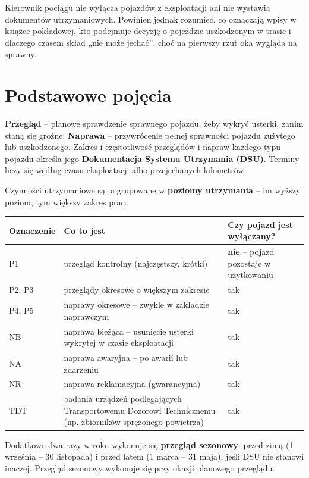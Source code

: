 Kierownik pociągu nie wyłącza pojazdów z eksploatacji ani nie wystawia dokumentów utrzymaniowych. Powinien jednak rozumieć, co oznaczają wpisy w książce pokładowej, kto podejmuje decyzję o pojeździe uszkodzonym w trasie i dlaczego czasem skład „nie może jechać”, choć na pierwszy rzut oka wygląda na sprawny.

\section{Podstawowe pojęcia}

\textbf{Przegląd} – planowe sprawdzenie sprawnego pojazdu, żeby wykryć usterki, zanim staną się groźne. \textbf{Naprawa} – przywrócenie pełnej sprawności pojazdu zużytego lub uszkodzonego. Zakres i częstotliwość przeglądów i napraw każdego typu pojazdu określa jego \textbf{Dokumentacja Systemu Utrzymania (DSU)}. Terminy liczy się według czasu eksploatacji albo przejechanych kilometrów.

Czynności utrzymaniowe są pogrupowane w \textbf{poziomy utrzymania} – im wyższy poziom, tym większy zakres prac:

\begin{center}
\begin{tabularx}{\linewidth}{@{}l>{\raggedright\arraybackslash}X>{\raggedright\arraybackslash}X@{}}
	\toprule
	\textbf{Oznaczenie} & \textbf{Co to jest} & \textbf{Czy pojazd jest wyłączany?} \\
	\midrule
	P1 & przegląd kontrolny (najczęstszy, krótki) & \textbf{nie} – pojazd pozostaje w użytkowaniu \\
	P2, P3 & przeglądy okresowe o większym zakresie & tak \\
	P4, P5 & naprawy okresowe – zwykle w zakładzie naprawczym & tak \\
	\midrule
	NB & naprawa bieżąca – usunięcie usterki wykrytej w czasie eksploatacji & tak \\
	NA & naprawa awaryjna – po awarii lub zdarzeniu & tak \\
	NR & naprawa reklamacyjna (gwarancyjna) & tak \\
	TDT & badania urządzeń podlegających Transportowemu Dozorowi Technicznemu (np. zbiorników sprężonego powietrza) & tak \\
	\bottomrule
\end{tabularx}
\end{center}

Dodatkowo dwa razy w roku wykonuje się \textbf{przegląd sezonowy}: przed zimą (1 września – 30 listopada) i przed latem (1 marca – 31 maja), jeśli DSU nie stanowi inaczej. Przegląd sezonowy wykonuje się przy okazji planowego przeglądu.

